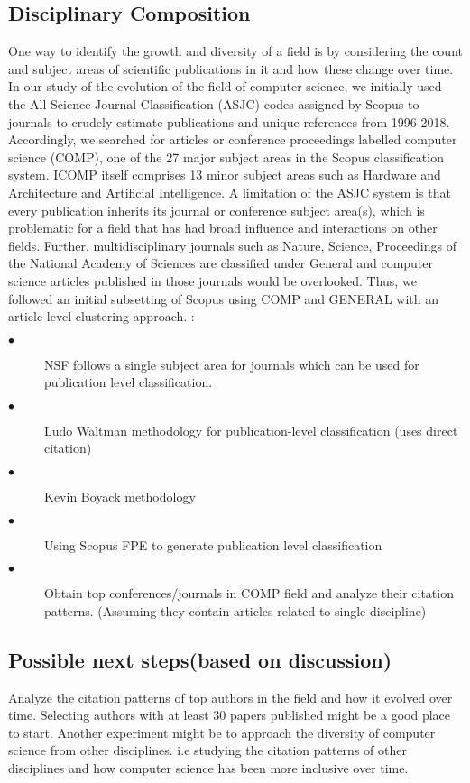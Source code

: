 \documentclass[11pt, oneside]{article}   	%
\begin{document}
\subsection{Disciplinary Composition} One way to identify the growth and diversity of a field is by considering the count and subject areas of scientific publications in it and how these change over time. In our study of the evolution of the field of computer science, we initially used the All Science Journal Classification (ASJC) codes assigned by Scopus to journals to crudely estimate publications and unique references from 1996-2018. Accordingly, we searched for articles or conference proceedings labelled computer science (COMP), one of the 27 major subject areas in the Scopus classification system. ICOMP itself comprises 13 minor subject areas such as Hardware and Architecture and Artificial Intelligence. A limitation of the ASJC system is that every publication inherits its journal or conference subject area(s), which is problematic for a field that has had broad influence and interactions on other fields. Further, multidisciplinary journals such as Nature, Science, Proceedings of the National Academy of Sciences are classified under General and computer science articles published in those journals would be overlooked. Thus, we followed an initial subsetting of Scopus using COMP and GENERAL with an article level clustering approach. :

\begin{description}
\item[$\bullet$ ] NSF follows a single subject area for journals which can be used for publication level classification.
\item[$\bullet$ ] Ludo Waltman methodology for publication-level classification (uses direct citation)
\item[$\bullet$ ] Kevin Boyack methodology 
\item[$\bullet$ ] Using Scopus FPE to generate publication level classification
\item[$\bullet$ ] Obtain top conferences/journals in COMP field and analyze their citation patterns. (Assuming they contain articles related to single discipline)
\end{description}

\subsection{Possible next steps(based on discussion)}  Analyze the citation patterns of top authors in the field and how it evolved over time. Selecting authors with at least 30 papers published might be a good place to start. Another experiment might be to approach the diversity of computer science from other disciplines. i.e studying the citation patterns of other disciplines and how computer science has been more inclusive over time.
\end{document}
